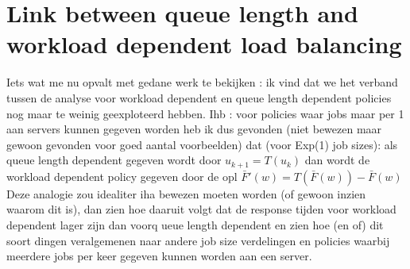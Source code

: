 \documentclass[12pt]{report}
\begin{document}
\section{Link between queue length and workload dependent load balancing}
Iets wat me nu opvalt met gedane werk te bekijken : ik vind dat we het verband tussen de analyse voor workload dependent en queue length dependent policies nog maar te weinig geexploteerd hebben. Ihb : voor policies waar jobs maar per 1 aan servers kunnen gegeven worden heb ik dus gevonden (niet bewezen maar gewoon gevonden voor goed aantal voorbeelden) dat (voor Exp(1) job sizes):
als queue length dependent gegeven wordt door $u_{k+1} = T(u_k)$ dan wordt de workload dependent policy gegeven door de opl $\bar F'(w) = T(\bar F(w)) - \bar F(w)$
Deze analogie zou idealiter iha bewezen moeten worden (of gewoon inzien waarom dit is), dan zien hoe daaruit volgt dat de response tijden voor workload dependent lager zijn dan voorq ueue length dependent en zien hoe (en of) dit soort dingen veralgemenen naar andere job size verdelingen en policies waarbij meerdere jobs per keer gegeven kunnen worden aan een server.
\end{document}
